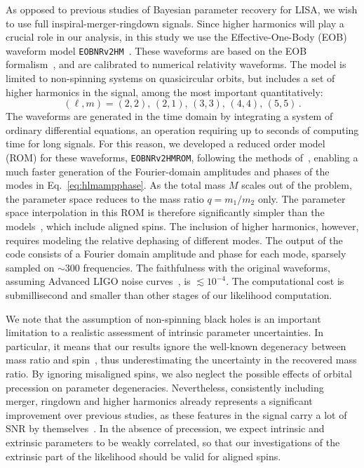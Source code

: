 \documentclass[aps,showpacs,twocolumn,prd,superscriptaddress,nofootinbib]{revtex4-1}
\newcommand{\be}{\begin{equation}}
\newcommand{\ee}{\end{equation}}
\begin{document}
As opposed to previous studies of Bayesian parameter recovery for LISA, we wish to use full inspiral-merger-ringdown signals. Since higher harmonics will play a crucial role in our analysis, in this study we use the Effective-One-Body (EOB) waveform model \texttt{EOBNRv2HM}~\cite{Pan+11}. These waveforms are based on the EOB formalism~\cite{BD99, BD00}, and are calibrated to numerical relativity waveforms. The model is limited to non-spinning systems on quasicircular orbits, but includes a set of higher harmonics in the signal, among the most important quantitatively:
\be\label{eq:listmodes}
	(\ell, m) = (2,2) ,\, (2,1) ,\, (3,3) ,\, (4,4) ,\, (5,5) \,.
\ee
The waveforms are generated in the time domain by integrating a system of ordinary differential equations, an operation requiring up to seconds of computing time for long signals. For this reason, we developed a reduced order model (ROM) for these waveforms, \texttt{EOBNRv2HMROM}, following the methods of~\cite{Puerrer14}, enabling a much faster generation of the Fourier-domain amplitudes and phases of the modes in Eq.~\eqref{eq:hlmampphase}. As the total mass $M$ scales out of the problem, the parameter space reduces to the mass ratio $q=m_{1}/m_{2}$ only. The parameter space interpolation in this ROM is therefore significantly simpler than the models~\cite{Puerrer14, Puerrer15, Bohe+16}, which include aligned spins. The inclusion of higher harmonics, however, requires modeling the relative dephasing of different modes. The output of the code consists of a Fourier domain amplitude and phase for each mode, sparsely sampled on $\sim 300$ frequencies.
The faithfulness with the original waveforms, assuming Advanced LIGO noise curves~\cite{UnofficialNoiseCurves18}, is $\lesssim 10^{-4}$.
The computational cost is submillisecond and smaller than other stages of our likelihood computation.

We note that the assumption of non-spinning black holes is an important limitation to a realistic assessment of intrinsic parameter uncertainties. In particular, it means that our results ignore the well-known degeneracy between mass ratio and spin~\cite{CF94, PW95, Baird+2013}, thus underestimating the uncertainty in the recovered mass ratio. By ignoring misaligned spins, we also neglect the possible effects of orbital precession on parameter degeneracies. Nevertheless, consistently including merger, ringdown and higher harmonics already represents a significant improvement over previous studies, as these features in the signal carry a lot of SNR by themselves~\cite{Babak+08, Thorpe+08, McWilliams+09, McWilliams+10, McWilliams+11, Klein+15}.
In the absence of precession, we expect intrinsic and extrinsic parameters to be weakly correlated, so that  our investigations of the extrinsic part of the likelihood should be valid for aligned spins.
\end{document}
